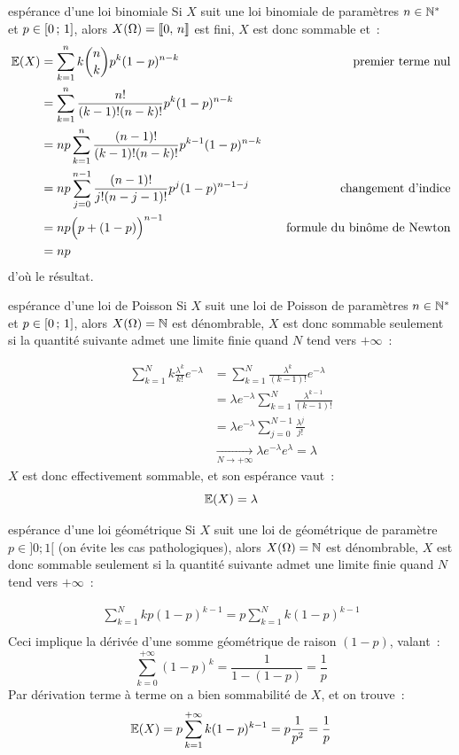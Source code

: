 \begin{exemple}{}{espérance d'une loi binomiale}
    Si $X$ suit une loi binomiale de paramètres $n \in \mathbb{N}^*$ et $p \in [0\, ; \, 1]$, alors $X(\Omega) = \llbracket 0 ,\, n \rrbracket$ est fini, $X$ est donc sommable et~:
    \begin{align*}
        \mathbb{E}(X) &= \sum_{k=1}^n k \binom{n}{k} p^k (1-p)^{n-k} \qquad &\text{premier terme nul}\\
        &= \sum_{k=1}^n \frac{n!}{(k-1)!(n-k)!} p^k (1-p)^{n-k} \\
        &= np \sum_{k=1}^n \frac{(n-1)!}{(k-1)!(n-k)!} p^{k-1} (1-p)^{n-k} \\
        &= np \sum_{j=0}^{n-1} \frac{(n-1)!}{j!(n-j-1)!} p^j (1-p)^{n-1-j}\qquad &\text{changement d'indice}\\
        &= np \Big(p + (1-p)\Big)^{n-1} \qquad &\text{formule du binôme de Newton}\\
        &= np
    \end{align*}
    d'où le résultat.
\end{exemple}

\begin{exemple}{}{espérance d'une loi de Poisson}
    Si $X$ suit une loi de Poisson de paramètres $n \in \mathbb{N}^*$ et $p \in [0\, ; \, 1]$, alors $X(\Omega) = \mathbb{N}$ est dénombrable, $X$ est donc sommable seulement si la quantité suivante admet une limite finie quand $N$ tend vers $+\infty$~:

    \begin{align*}
        \sum_{k=1}^N k \frac{\lambda^k}{k!}e^{-\lambda}
        &= \sum_{k=1}^N \frac{\lambda^k}{(k-1)!}e^{-\lambda}\\
        &= \lambda e^{-\lambda} \sum_{k=1}^N \frac{\lambda^{k-1}}{(k-1)!}\\
        &= \lambda e^{-\lambda} \sum_{j=0}^{N-1} \frac{\lambda^j}{j!}\\
        &\xrightarrow[N \to +\infty]{} \lambda e^{-\lambda} e^{\lambda} = \lambda
    \end{align*}
    $X$ est donc effectivement sommable, et son espérance vaut~:
    $$\mathbb{E}(X) = \lambda$$
\end{exemple}

\begin{exemple}{}{espérance d'une loi géométrique}
    Si $X$ suit une loi de géométrique de paramètre $p \in ]0; 1[$ (on évite les cas pathologiques), alors $X(\Omega) = \mathbb{N}$ est dénombrable, $X$ est donc sommable seulement si la quantité suivante admet une limite finie quand $N$ tend vers $+\infty$~:

    \begin{align*}
        \sum_{k=1}^N k p (1-p)^{k-1} = p \sum_{k=1}^N k (1-p)^{k-1}\\
    \end{align*}
    Ceci implique la dérivée d'une somme géométrique de raison $(1-p)$, valant~:
    $$\sum_{k=0}^{+\infty} (1-p)^k = \frac{1}{1-(1-p)} = \frac{1}{p}$$
    Par dérivation terme à terme on a bien sommabilité de $X$, et on trouve~:
    $$\mathbb{E}(X) = p\sum_{k=1}^{+\infty} k (1-p)^{k-1} = p\frac{1}{p^2} = \frac{1}{p}$$
\end{exemple}

